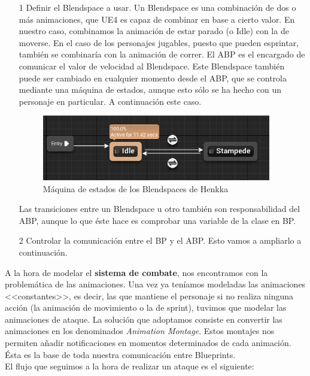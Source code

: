 \begin{itemize}
\item[1] Definir el Blendspace a usar. Un Blendspace es una combinación de dos o más animaciones, que \ac{UE4} es capaz de combinar en base a cierto valor. En nuestro caso, combinamos la animación de estar parado (o Idle) con la de moverse. En el caso de los personajes jugables, puesto que pueden esprintar, también se combinaría con la animación de correr. El \ac{ABP} es el encargado de comunicar el valor de velocidad al Blendspace. Este Blendspace también puede ser cambiado en cualquier momento desde el \ac{ABP}, que se controla mediante una máquina de estados, aunque esto sólo se ha hecho con un personaje en particular. A continuación este caso.


\begin{figure}[H]
  \centering
  \includegraphics[width=10cm]{./images/Henkka_SM.png}
  \caption{Máquina de estados de los Blendspaces de Henkka}
  \label{HenkkaSM}
\end{figure}


Las transiciones entre un Blendspace u otro también son responsabilidad del \ac{ABP}, aunque lo que éste hace es comprobar una variable de la clase en \ac{BP}.

\item[2] Controlar la comunicación entre el \ac{BP} y el \ac{ABP}. Esto vamos a ampliarlo a continuación.
\end{itemize}


A la hora de modelar el \textbf{sistema de combate}, nos encontramos con la problemática de las animaciones. Una vez ya teníamos modeladas las animaciones <<constantes>>, es decir, las que mantiene el personaje si no realiza ninguna acción (la animación de movimiento o la de sprint), tuvimos que modelar las animaciones de ataque. La solución que adoptamos consiste en convertir las animaciones en los denominados \textit{Animation Montage}. Estos montajes nos permiten añadir notificaciones en momentos determinados de cada animación. Ésta es la base de toda nuestra comunicación entre Blueprints.
\\

El flujo que seguimos a la hora de realizar un ataque es el siguiente:


